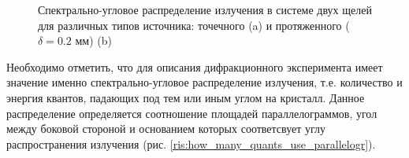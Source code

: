\begin{figure}[H]
  \centering
  \hfill
  \caption{Спектрально-угловое распределение излучения в системе двух щелей для различных типов источника: точечного (a)
  и протяженного ($\delta = 0.2$ мм) (b)}
  \label{ris:sourc_map}
\end{figure}

Необходимо отметить, что для описания дифракционного эксперимента имеет значение именно
спектрально-угловое распределение излучения, т.е. количество и энергия квантов, падающих под тем
или иным углом на кристалл. Данное распределение определяется соотношение площадей параллелограммов,
угол между боковой стороной и основанием которых соответсвует углу распространения излучения
(рис. \ref{ris:how_many_quants_use_parallelogr}).

